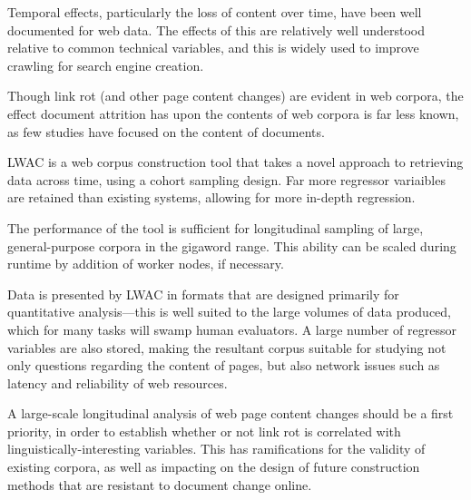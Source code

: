 

Temporal effects, particularly the loss of content over time, have been well documented for web data.  The effects of this are relatively well understood relative to common technical variables, and this is widely used to improve crawling for search engine creation.

Though link rot (and other page content changes) are evident in web corpora, the effect document attrition has upon the contents of web corpora is far less known, as few studies have focused on the content of documents.

LWAC is a web corpus construction tool that takes a novel approach to retrieving data across time, using a cohort sampling design.  Far more regressor variaibles are retained than existing systems, allowing for more in-depth regression.

The performance of the tool is sufficient for longitudinal sampling of large, general-purpose corpora in the gigaword range.  This ability can be scaled during runtime by addition of worker nodes, if necessary.

Data is presented by LWAC in formats that are designed primarily for quantitative analysis---this is well suited to the large volumes of data produced, which for many tasks will swamp human evaluators.  A large number of regressor variables are also stored, making the resultant corpus suitable for studying not only questions regarding the content of pages, but also network issues such as latency and reliability of web resources.

A large-scale longitudinal analysis of web page content changes should be a first priority, in order to establish whether or not link rot is correlated with linguistically-interesting variables.  This has ramifications for the validity of existing corpora, as well as impacting on the design of future construction methods that are resistant to document change online.





